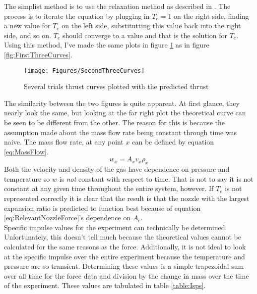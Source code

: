 The simplist method is to use the relaxation method as described in \cite{newman}. The process is to iterate the equation by plugging in $T_e=1$ on the right side, finding a new value for $T_e$ on the left side, substitutting this value back into the right side, and so on. $T_e$ should converge to a value and that is the solution for $T_e$. Using this method, I've made the same plots in figure \ref{fig:SecondThreeCurves} as in figure \ref{fig:FirstThreeCurves}.
\begin{figure}[h!]
\centering
\texttt{[image: Figures/SecondThreeCurves]}
\caption{Several trials thrust curves plotted with the predicted thrust}
\label{fig:SecondThreeCurves}
\end{figure}
The similarity between the two figures is quite apparent. At first glance, they nearly look the same, but looking at the far right plot the theoretical curve can be seen to be different from the other. The reason for this is because the assumption made about the mass flow rate being constant through time was naive. The mass flow rate, at any point $x$  can be defined by equation \ref{eq:MassFlow}.
\begin{equation}
w_x=A_x v_x \rho_x
\end{equation}
Both the velocity and density of the gas have dependence on pressure and temperature so $w$ is \textit{not} constant with respect to time. That is not to say it is not constant at any given time throughout the entire system, however. If $T_e$ is not represented correctly it is clear that the result is that the nozzle with the largest expansion ratio is predicted to function best because of equation \ref{eq:RelevantNozzleForce}'s dependence on $A_e$. \\
Specific impulse values for the experiment can technically be determined. Unfortunately, this doesn't tell much because the theoretical values cannot be calculated for the same reasons as the force. Additionally, it is not ideal to look at the specific impulse over the entire experiment because the temperature and pressure are so transient. Determining these values is a simple trapezoidal sum over all time for the force data and division by the change in mass over the time of the experiment. These values are tabulated in table \ref{table:Isps}.
